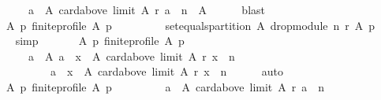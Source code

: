 \begin{isabellebody}
\ \ \ \ \ \ \ \ {\isacharbraceleft}{\kern0pt}a\ {\isasymin}\ A{\isachardot}{\kern0pt}\ card{\isacharparenleft}{\kern0pt}above\ {\isacharparenleft}{\kern0pt}limit\ A\ r{\isacharparenright}{\kern0pt}\ a{\isacharparenright}{\kern0pt}\ {\isachargreater}{\kern0pt}\ n{\isacharbraceright}{\kern0pt}\ {\isacharequal}{\kern0pt}\ A{\isachardoublequoteclose}\isanewline
\ \ \ \ \isamarkupfalse%
\ blast\isanewline
\ \ \isamarkupfalse%
\ {}{\isacharcolon}{\kern0pt}\isanewline
\ \ \ \ {\isachardoublequoteopen}{\isasymforall}A\ p{\isachardot}{\kern0pt}\ finite{\isacharunderscore}{\kern0pt}profile\ A\ p\ {\isasymlongrightarrow}\isanewline
\ \ \ \ \ \ \ \ set{\isacharunderscore}{\kern0pt}equals{\isacharunderscore}{\kern0pt}partition\ A\ {\isacharparenleft}{\kern0pt}drop{\isacharunderscore}{\kern0pt}module\ n\ r\ A\ p{\isacharparenright}{\kern0pt}{\isachardoublequoteclose}\isanewline
\ \ \ \ \isamarkupfalse%
\ simp\isanewline
\ \ \isamarkupfalse%
\isanewline
\ \ \ \ {\isachardoublequoteopen}{\isasymforall}A\ p{\isachardot}{\kern0pt}\ finite{\isacharunderscore}{\kern0pt}profile\ A\ p\ {\isasymlongrightarrow}\isanewline
\ \ \ \ \ \ \ \ {\isacharparenleft}{\kern0pt}{\isasymforall}a\ {\isasymin}\ A{\isachardot}{\kern0pt}\ {\isasymnot}{\isacharparenleft}{\kern0pt}a\ {\isasymin}\ {\isacharbraceleft}{\kern0pt}x\ {\isasymin}\ A{\isachardot}{\kern0pt}\ card{\isacharparenleft}{\kern0pt}above\ {\isacharparenleft}{\kern0pt}limit\ A\ r{\isacharparenright}{\kern0pt}\ x{\isacharparenright}{\kern0pt}\ {\isasymle}\ n{\isacharbraceright}{\kern0pt}\ {\isasymand}\isanewline
\ \ \ \ \ \ \ \ \ \ \ \ a\ {\isasymin}\ {\isacharbraceleft}{\kern0pt}x\ {\isasymin}\ A{\isachardot}{\kern0pt}\ card{\isacharparenleft}{\kern0pt}above\ {\isacharparenleft}{\kern0pt}limit\ A\ r{\isacharparenright}{\kern0pt}\ x{\isacharparenright}{\kern0pt}\ {\isachargreater}{\kern0pt}\ n{\isacharbraceright}{\kern0pt}{\isacharparenright}{\kern0pt}{\isacharparenright}{\kern0pt}{\isachardoublequoteclose}\isanewline
\ \ \ \ \isamarkupfalse%
\ auto\isanewline
\ \ \isamarkupfalse%
\isanewline
\ \ \ \ {\isachardoublequoteopen}{\isasymforall}A\ p{\isachardot}{\kern0pt}\ finite{\isacharunderscore}{\kern0pt}profile\ A\ p\ {\isasymlongrightarrow}\isanewline
\ \ \ \ \ \ \ \ {\isacharbraceleft}{\kern0pt}a\ {\isasymin}\ A{\isachardot}{\kern0pt}\ card{\isacharparenleft}{\kern0pt}above\ {\isacharparenleft}{\kern0pt}limit\ A\ r{\isacharparenright}{\kern0pt}\ a{\isacharparenright}{\kern0pt}\ {\isasymle}\ n{\isacharbraceright}{\kern0pt}\ {\isasyminter}\isanewline

\end{isabellebody}
